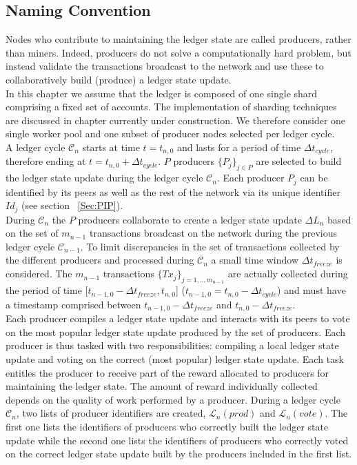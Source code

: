 \subsection{Naming Convention}

Nodes who contribute to maintaining the ledger state are called producers, rather than miners. Indeed, producers do not solve a computationally hard problem, but instead validate the transactions broadcast to the network and use these to collaboratively build (produce) a ledger state update. \\

In this chapter we assume that the ledger is composed of one single shard comprising a fixed set of accounts. The implementation of sharding techniques are discussed in chapter currently under construction.
We therefore consider one single worker pool and one subset of producer nodes selected per ledger cycle. \\

A ledger cycle $\mathcal{C}_n$ starts at time $t = t_{n,0}$ and lasts for a period of time $\Delta t_{cycle}$, therefore ending at $t = t_{n,0}+ \Delta t_{cycle}$. $P$ producers $\{P_j\}_{j\in P}$ are selected to build the ledger state update during the ledger cycle $\mathcal{C}_n$. Each producer $P_j$ can be identified by its peers as well as the rest of the network via its unique identifier $Id_j$ (see section ~\ref{Sec:PIP}).\\

During $\mathcal{C}_n$ the $P$ producers collaborate to create a ledger state update $\Delta L_{n}$ based on the set of $m_{n-1}$ transactions broadcast on the network during the previous ledger cycle $\mathcal{C}_{n-1}$. To limit discrepancies in the set of transactions collected by the different producers and processed during $\mathcal{C}_n$ a small time window $\Delta t_{freeze}$ is considered. The $m_{n-1}$ transactions $\{Tx_j\}_{j=1,..,m_{n-1}}$ are actually collected during the period of time [$t_{n-1,0} - \Delta t_{freeze}, t_{n,0}$] ($t_{n-1,0} = t_{n,0} - \Delta t_{cycle}$) and must have a timestamp comprised between $t_{n-1,0} - \Delta t_{freeze}$ and $t_{n,0} - \Delta t_{freeze}$.\\

Each producer compiles a ledger state update and interacts with its peers to vote on the most popular ledger state update produced by the set of producers. Each producer is thus tasked with two responsibilities: compiling a local ledger state update and voting on the correct (most popular) ledger state update. Each task entitles the producer to receive part of the reward allocated to producers for maintaining the ledger state. The amount of reward individually collected depends on the quality of work performed by a producer. During a ledger cycle $\mathcal{C}_n$, two lists of producer identifiers are created, $\mathcal{L}_n(prod)$ and $\mathcal{L}_n(vote)$. The first one lists the identifiers of producers who correctly built the ledger state update while the second one lists the identifiers of producers who correctly voted on the correct ledger state update built by the producers included in the first list.\\


